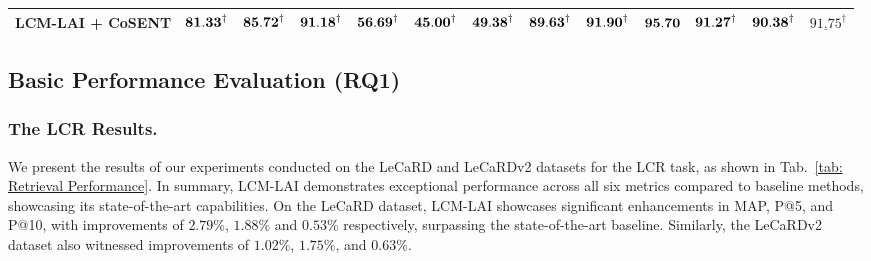 \begin{table*}[t]
{\begin{tabular}{lcccccccccccc}
 \bf{LCM-LAI + CoSENT}       
                & $ \bf {81.33}^{\dagger} $     & $ \bf {85.72}^{\dagger} $     & $ \bf {91.18}^{\dagger} $     & $ \bf {56.69}^{\dagger} $     & $ \bf {45.00}^{\dagger} $      & $ \bf {49.38}^{\dagger} $ 
                & $ \bf{89.63}^{\dagger} $     & $ \bf{91.90}^{\dagger} $     & $ \bf{95.70} $     & $ \bf{91.27}^{\dagger} $     & $ \bf{90.38}^{\dagger} $      & $ \underline{91.75}^{\dagger} $     \\
 \bottomrule
\end{tabular}%
}
\end{table*}

\subsection{Basic Performance Evaluation (RQ1)}
\subsubsection{The LCR Results.} 
We present the results of our experiments conducted on the LeCaRD and LeCaRDv2 datasets for the LCR task, as shown in Tab.~\ref{tab: Retrieval Performance}.
In summary, LCM-LAI demonstrates exceptional performance across all six metrics compared to baseline methods, showcasing its state-of-the-art capabilities.
On the LeCaRD dataset, LCM-LAI showcases significant enhancements in MAP, P@5, and P@10, with improvements of $2.79\%$, $1.88\%$ and $0.53\%$ respectively, surpassing the state-of-the-art baseline. Similarly, the LeCaRDv2 dataset also witnessed improvements of $1.02\%$, $1.75\%$, and $0.63\%$.

